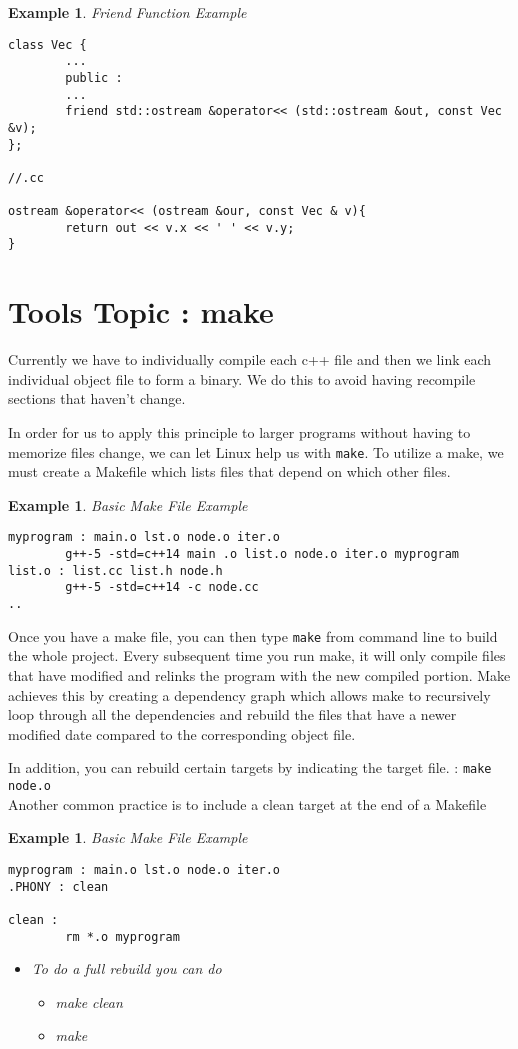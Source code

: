 \documentclass{article}
\newtheorem{ex}[theorem]{Example}
\begin{document}
\begin{ex} Friend Function Example 
\begin{lstlisting}
class Vec {
		...
		public :
		...
		friend std::ostream &operator<< (std::ostream &out, const Vec &v);
};

//.cc

ostream &operator<< (ostream &our, const Vec & v){
		return out << v.x << ' ' << v.y;
}
\end{lstlisting}
\end{ex}


\section{Tools Topic : make }

Currently we have to individually compile each c++ file and then we link each individual object file to form a binary. We do this to avoid having recompile sections that haven't change. 

In order for us to apply this principle to larger programs without having to memorize files change, we can let Linux help us with \verb|make|. To utilize a make, we must create a Makefile which lists files that depend on which other files. 

\begin{ex} Basic Make File Example 
\begin{lstlisting}
myprogram : main.o lst.o node.o iter.o 
		g++-5 -std=c++14 main .o list.o node.o iter.o myprogram 
list.o : list.cc list.h node.h 
	    g++-5 -std=c++14 -c node.cc
..
\end{lstlisting}
\end{ex}

Once you have a make file, you can then type \verb|make| from command line to build the whole project. Every subsequent time you run make, it will only compile files that have modified and relinks the program with the new compiled portion.  Make achieves this by creating a dependency graph which allows make to recursively loop through all the dependencies and rebuild the files that have a newer modified date compared to the corresponding object file.  

In addition, you can rebuild certain targets by indicating the target file. : \verb|make node.o| \\
Another common practice is to include a clean target at the end of a Makefile 

\begin{ex} Basic Make File Example 
\begin{lstlisting}
myprogram : main.o lst.o node.o iter.o 
.PHONY : clean 

clean : 
		rm *.o myprogram 
\end{lstlisting}
\begin{itemize}
\item To do a full rebuild you can do 
\begin{itemize}
\item make clean 
\item make 
\end{itemize}
\end{itemize}
\end{ex}
\end{document}

